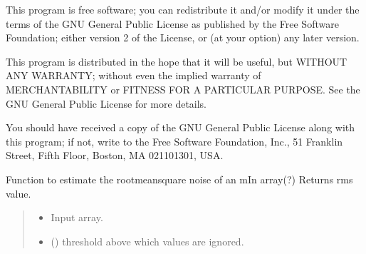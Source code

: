\documentclass[letterpaper,10pt,english]{sphinxmanual}
\begin{document}
\sphinxAtStartPar
This program is free software; you can redistribute it and/or
modify it under the terms of the GNU General Public License
as published by the Free Software Foundation; either version 2
of the License, or (at your option) any later version.

\sphinxAtStartPar
This program is distributed in the hope that it will be useful,
but WITHOUT ANY WARRANTY; without even the implied warranty of
MERCHANTABILITY or FITNESS FOR A PARTICULAR PURPOSE.  See the
GNU General Public License for more details.

\sphinxAtStartPar
You should have received a copy of the GNU General Public License
along with this program; if not, write to the Free Software
Foundation, Inc., 51 Franklin Street, Fifth Floor, Boston, MA  02110\sphinxhyphen{}1301, USA.

\begin{fulllineitems}
\label{\detokenize{api/killMS.Other:killMS.Other.findrms.findrms}}
\pysigstartsignatures
{}
\pysigstopsignatures
\sphinxAtStartPar
Function to estimate the root\sphinxhyphen{}mean\sphinxhyphen{}square noise of an mIn array(?)
Returns rms value.
\begin{quote}\begin{description}
\begin{itemize}
\item {} 
\sphinxAtStartPar
{} \textendash{} Input array.

\item {} 
\sphinxAtStartPar
{} () \textendash{} threshold above which values are ignored.

\end{itemize}

\sphinxAtStartPar
{}

\end{description}\end{quote}

\end{fulllineitems}
\end{document}
